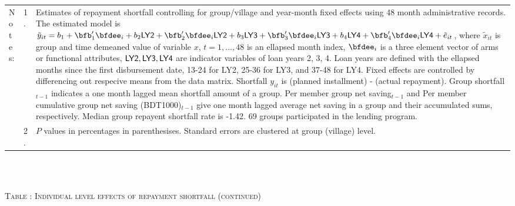 \begin{minipage}[t]{14cm}
\begin{tabular}{>{\hfill\scriptsize}p{1cm}<{}>{\hfill\scriptsize}p{.25cm}<{}>{\scriptsize}p{12cm}<{\hfill}}
Notes: & 1. & Estimates of repayment shortfall controlling for group/village and year-month fixed effects using 48 month administrative records. The estimated model is $\tilde{y}_{it}=b_{1}+\bfb'_{1}\bfdee_{i}+b_{2}\mbox{\textsf{LY2}}+\bfb'_{2}\bfdee_{i}\mbox{\textsf{LY2}}+b_{3}\mbox{\textsf{LY3}}+\bfb'_{3}\bfdee_{i}\mbox{\textsf{LY3}}+b_{4}\mbox{\textsf{LY4}}+\bfb'_{4}\bfdee_{i}\mbox{\textsf{LY4}}+\tilde{e}_{it}$, where $\tilde{x}_{it}$ is group and time demeaned value of variable $x$, $t=1,\dots, 48$ is an ellapsed month index, $\bfdee_{i}$ is a three element vector of arms or functional attributes, $\mbox{\textsf{LY2}}, \mbox{\textsf{LY3}}, \mbox{\textsf{LY4}}$ are indicator variables of loan years 2, 3, 4. Loan years are defined with the ellapsed months since the first disbursement date, 13-24 for \textsf{LY2}, 25-36 for \textsf{LY3}, and 37-48 for \textsf{LY4}. Fixed effects are controlled by differencing out respecive means from the data matrix. Shortfall $y_{it}$ is (planned installment) - (actual repayment). \textsf{Group shortfall}$_{t-1}$ indicates a one month lagged mean shortfall amount of a group. \textsf{Per member group net saving}$_{t-1}$ and \textsf{Per member cumulative group net saving (BDT1000)}$_{t-1}$ give one month lagged average net saving in a group and their accumulated sums, respectively. Median group repayent shortfall rate is -1.42. 69 groups participated in the lending program.  \\
& 2. &  $P$ values in percentages in parenthesises. Standard errors are clustered at group (village) level. %
 \end{tabular}
\end{minipage} \\\\\addtocounter{table}{-1}\hspace{-1cm}\begin{minipage}[t]{14cm} \hfil\textsc{\normalsize Table \thetable: Individual level effects of repayment shortfall (continued)\label{tab shortfall indiv o800 2}}\\ \setlength{\tabcolsep}{1pt}
  \setlength{\baselineskip}{8pt}
  \renewcommand{\arraystretch}{.55}
  \hfil{}
\end{minipage}
